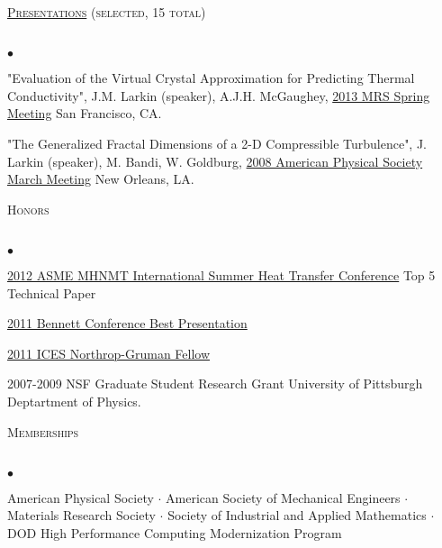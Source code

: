 \documentclass{article}
\newcommand{\lineunder}{\vspace*{-8pt} \\ \hspace*{-18pt} \hrulefill \\}
\newcommand{\header}[1]{{\hspace*{-15pt}\vspace*{6pt} \textsc{#1}} \vspace*{-6pt} \lineunder}
\newenvironment{achievements}{\begin{list}{$\bullet$}{\topsep 0pt \itemsep -2pt}}{\vspace*{4pt}\end{list}}
\begin{document}
\header{\href{http://jasonlarkin.github.io/pres.html}{Presentations} (selected, 15 total)}
\begin{achievements}
\item "Evaluation of the Virtual Crystal Approximation for Predicting Thermal Conductivity", J.M. Larkin (speaker), A.J.H.
   McGaughey, \href{http://www.mrs.org/spring2013/}{2013 MRS Spring Meeting} San Francisco, CA.
\item "The Generalized Fractal Dimensions of a 2-D Compressible Turbulence", J. Larkin (speaker), M. Bandi, W. Goldburg, \href{http://meetings.aps.org/Meeting/MAR08/Content/1017}{2008 American Physical Society March Meeting} New Orleans, LA.
\end{achievements}


\header{Honors}
\begin{achievements}
\item \href{http://www.asmeconferences.org/HT2012/}{2012 ASME MHNMT International Summer Heat Transfer Conference} Top 5 Technical Paper
\item \href{http://www.cmu.edu/me/news/archive/2011/bennett-conference.html}{2011 Bennett Conference Best Presentation}
\item \href{http://www.ices.cmu.edu/newsitem.asp?NewsID=749}{2011 ICES Northrop-Gruman Fellow}
\item 2007-2009 NSF Graduate Student Research Grant University of Pittsburgh Deptartment of Physics.
\end{achievements}

\header{Memberships}
\begin{achievements}
\item American Physical Society $\cdot$ American Society of Mechanical Engineers 
$\cdot$ Materials Research Society $\cdot$ Society of Industrial and Applied Mathematics $\cdot$ DOD High Performance Computing Modernization Program
\end{achievements}
\end{document}
